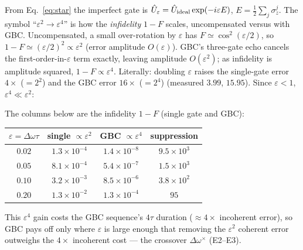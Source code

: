 \documentclass[aps,prapplied,twocolumn,superscriptaddress,floatfix,nofootinbib]{revtex4-2}
\begin{document}
From Eq.~\eqref{eq:star} the imperfect gate is $\hat U_\varepsilon=\hat U_{\rm ideal}\exp(-i\varepsilon E)$,
$E=\tfrac12\sum_j\sigma_z^j$. The symbol ``$\varepsilon^2\!\to\!\varepsilon^4$'' is how the
\emph{infidelity} $1-F$ scales, uncompensated versus with GBC. Uncompensated, a small over-rotation
by $\varepsilon$ has $F\simeq\cos^2(\varepsilon/2)$, so $1-F\simeq(\varepsilon/2)^2\propto\varepsilon^2$
(error amplitude $O(\varepsilon)$). GBC's three-gate echo cancels the first-order-in-$\varepsilon$
term exactly, leaving amplitude $O(\varepsilon^2)$; as infidelity is amplitude squared,
$1-F\propto\varepsilon^4$. Literally: doubling $\varepsilon$ raises the single-gate error $4\times$
($=2^2$) and the GBC error $16\times$ ($=2^4$) (measured $3.99$, $15.95$). Since $\varepsilon<1$,
$\varepsilon^4\!\ll\!\varepsilon^2$:

The columns below are the infidelity $1{-}F$ (single gate and GBC):
\begin{ruledtabular}\begin{tabular}{cccc}
$\varepsilon{=}\Delta\omega\tau$ & single $\propto\varepsilon^2$ & GBC $\propto\varepsilon^4$ & suppression \\ \hline
$0.02$ & $1.3\times10^{-4}$ & $1.4\times10^{-8}$ & $9.5\times10^{3}$ \\
$0.05$ & $8.1\times10^{-4}$ & $5.4\times10^{-7}$ & $1.5\times10^{3}$ \\
$0.10$ & $3.2\times10^{-3}$ & $8.5\times10^{-6}$ & $3.8\times10^{2}$ \\
$0.20$ & $1.3\times10^{-2}$ & $1.3\times10^{-4}$ & $95$ \\
\end{tabular}\end{ruledtabular}

This $\varepsilon^4$ gain costs the GBC sequence's $4\tau$ duration ($\approx4\times$ incoherent
error), so GBC pays off only where $\varepsilon$ is large enough that removing the $\varepsilon^2$
coherent error outweighs the $4\times$ incoherent cost --- the crossover $\Delta\omega^\times$ (E2--E3).



\end{document}
